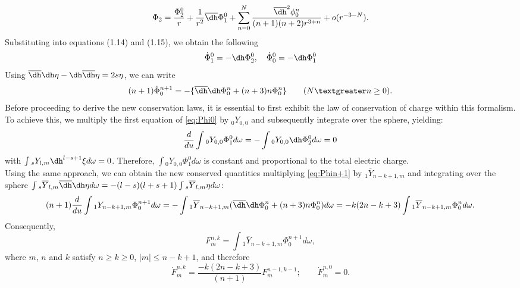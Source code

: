 \begin{equation}\label{eq:Phi2}
  \Phi_{2} = \frac{\Phi_{2}^{0}}{r} + \frac{1}{r^2}\overline{\dh} \Phi_{1}^{0} + \sum_{n=0}^{N}\frac{\overline{\dh}^2 \phi_{0}^{n}}{(n+1)(n+2)r^{3+n}}+o(r^{-3-N}).
\end{equation}
Substituting into equations (1.14) and (1.15), we obtain the following
\begin{equation}\label{eq:Phi0}
  \dot{\Phi}_{1}^{0} = -\dh\Phi_{2}^{0}, \quad \dot{\Phi}_{0}^{0} = -\dh \Phi_{1}^{0}
\end{equation}
Using  $\overline{\dh}\dh \eta - \dh \overline{\dh} \eta = 2s\eta$, we can write
\begin{equation}\label{eq:Phin+1}
  (n + 1)\dot{\Phi}_{0}^{n+1} = -\{\overline{\dh}\dh \Phi_{0}^{n} + (n+3)n\Phi_{0}^{n}\} \qquad (N \textgreater n \geq 0).
\end{equation}
Before proceeding to derive the new conservation laws, it is essential to first exhibit the law of conservation of charge within this formalism. To achieve this, we multiply the first equation of \eqref{eq:Phi0} by $_{0}Y_{0,0}$ and subsequently integrate over the sphere, yielding:
\begin{equation}\label{eq:YPhi0}
  \frac{d}{du} \int {_{0}Y_{0,0}\Phi_{1}^{0} d\omega} = - \int {_{0}Y_{0,0}\dh \Phi_{2}^{0} d\omega} = 0
\end{equation}
with $\int{_{s}Y_{l,m}\dh^{l-s+1}\xi d\omega} = 0$. Therefore, $\int {_{0}Y_{0,0}\Phi_{1}^{0} d\omega}$ is constant and proportional to the total electric charge.\\
Using the same approach, we can obtain the new conserved quantities multiplying \eqref{eq:Phin+1} by $_{1}\overline{Y}_{n-k+1,m}$ and integrating over the sphere $\int {_{s}\overline{Y}_{l,m}\overline{\dh}\dh \eta d \omega} = -(l-s)(l+s+1) \int{_{s}\overline{Y}_{l,m}\eta d\omega}$:
\begin{equation}\label{eq:Eleccharge}
  (n+1)\frac{d}{du}\int{_{1}Y_{n-k+1,m}\Phi_{0}^{n+1} d\omega} = - \int{_{1}\overline{Y}_{n-k+1,m}(\overline{\dh}\dh \Phi_{0}^{n}+(n+3)n\Phi_{0}^{n})d\omega} = -k(2n-k+3)\int{_{1}\overline{Y}_{n-k+1,m}\Phi_{0}^{n} d\omega}.
\end{equation}
Consequently,
\begin{equation}\label{eq:F}
  F_{m}^{n,k} = \int{_{1}\overline{Y}_{n-k+1,m}\Phi_{0}^{n+1} d\omega},
\end{equation}
where $m$, $n$ and $k$ satisfy $n \geq k \geq 0$, $|m| \leq n-k+1$, and therefore 
\begin{equation}\label{eq:Fdot}
  \dot{F}_{m}^{n,k} = \frac{-k(2n-k+3)}{(n+1)}F_{m}^{n-1,k-1} ; \qquad \dot{F}_{m}^{n,0} = 0.
\end{equation}
